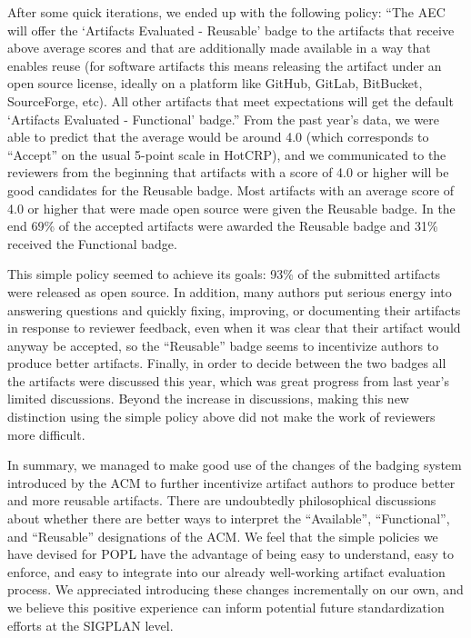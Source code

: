 After some quick iterations, we ended up with the following %
policy: “The AEC will offer the ‘Artifacts Evaluated -
Reusable’ badge to the artifacts that receive above average scores and
that are additionally made available in a way that enables reuse (for
software artifacts this means releasing the artifact under an open
source license, ideally on a platform like GitHub, GitLab, BitBucket,
SourceForge, etc). All other artifacts that meet expectations will get
the default ‘Artifacts Evaluated - Functional’ badge.” From the past
year’s data, we were able to predict that the average would be around
4.0 (which corresponds to “Accept” on the usual 5-point scale in
HotCRP), and we communicated to the reviewers from the beginning that
artifacts with a score of 4.0 or higher will be good candidates for
the Reusable badge. %
%
Most artifacts with an average score of 4.0 or higher that were made
open source were given the Reusable badge. In the end 69\% of the
accepted artifacts were awarded the Reusable badge and 31\% received
the Functional badge.

This simple policy seemed to achieve its goals: 93\% of the submitted
artifacts were released as open source. In addition, many authors put
serious energy into answering questions and quickly fixing, improving,
or documenting their artifacts in response to reviewer feedback, even
when it was clear that their artifact would anyway be accepted, so the
“Reusable” badge seems to incentivize authors to produce better
artifacts. Finally, in order to decide between the two badges all the
artifacts were discussed this year, which was great progress from last
year’s limited discussions. Beyond the increase in discussions, making
this new distinction using the simple policy above did not make the
work of reviewers more difficult.


In summary, we managed to make good use of the changes of the badging
system introduced by the ACM to further incentivize artifact authors
to produce better and more reusable artifacts. There are undoubtedly
philosophical discussions about whether there are better ways to
interpret the “Available”, “Functional”, and “Reusable” designations
of the ACM. We feel that the simple policies we have devised for
POPL have the advantage of being easy to understand, easy to enforce,
and easy to integrate into our already well-working artifact
evaluation process. We appreciated introducing these changes
incrementally on our own, and we believe this positive experience can
inform potential future standardization efforts at the SIGPLAN level.

